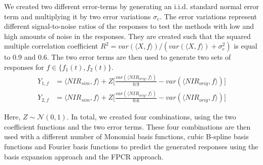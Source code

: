 \documentclass[11pt,twoside,a4paper]{article}
\begin{document}
		 We created two different error-terms by generating an i.i.d. standard normal error term and multiplying it by two error variations $\sigma_e $. The error variations represent different signal-to-noise ratios of the responses to test the methods with low and high amounts of noise in the responses. They are created such that the squared multiple correlation coefficient $R^2 = var(\langle X, f\rangle) / (var(\langle X, f\rangle) + \sigma^2_{e})$ is equal to 0.9 and 0.6. The two error terms are then used to generate two sets of responses for $f \in \{f_1(t), f_2(t)\}$.	
		\begin{equation}
			\begin{split}
				Y_{1,f} & = \langle NIR_{sim}, f\rangle + Z  \biggl\lbrack\frac{var(\langle NIR_{orig}, f\rangle)}{0.9} - var(\langle NIR_{orig}, f\rangle)\biggr\rbrack \\
				Y_{2,f} & = \langle NIR_{sim}, f\rangle + Z  \biggl\lbrack\frac{var(\langle NIR_{orig}, f\rangle)}{0.6} - var(\langle NIR_{orig}, f\rangle)\biggr\rbrack
			\end{split}
		\end{equation}
		
		Here, $Z \sim \mathcal{N}(0,1)$. In total, we created four combinations, using the two coefficient functions and the two error terms. These four combinations are then used with a different number of Monomial basis functions, cubic B-spline basis functions and Fourier basis functions to predict the generated responses using the basis expansion approach and the FPCR approach.\\
\end{document}
